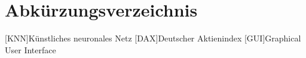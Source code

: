
\tableofcontents
\listoffigures
\listoftables
\listofformels

\chapter*{Abkürzungsverzeichnis}

\begin{acronym}[SEPSEP]
[KNN]{Künstliches neuronales Netz}
[DAX]{Deutscher Aktienindex}
[GUI]{Graphical User Interface}
\end{acronym}  
 
\clearpage
{} 
